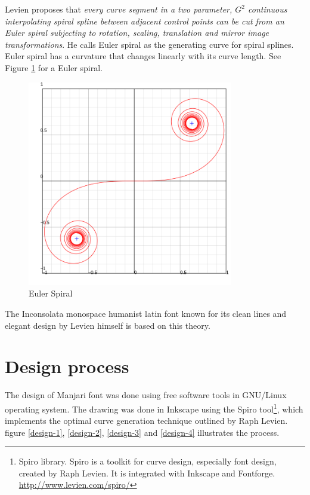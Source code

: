\documentclass[11pt,twoside,a4paper,parskip=full]{scrartcl}
\begin{document}
Levien proposes that \textit{every curve segment in a two parameter,  $G^2$ continuous interpolating spiral spline between adjacent control points can be cut from an Euler spiral subjecting to rotation, scaling, translation and mirror image transformations}. He calls Euler spiral as the generating curve for spiral splines. Euler spiral has a curvature that changes linearly with its curve length. See Figure \ref{eulerspiral} for a Euler spiral.


\begin{figure}
	\includegraphics[width=0.8\textwidth]{images/Euler_spiral.png}
	\caption{Euler Spiral}
	\label{eulerspiral}
\end{figure}


The Inconsolata monospace humanist latin font known for its clean lines and elegant design by Levien himself is based on this theory.

\section{Design process}

The design of Manjari font was done using free software tools in GNU/Linux operating system. The drawing was done in Inkscape using the Spiro tool\footnote{Spiro library. Spiro is a toolkit for curve design, especially font design, created by Raph Levien. It is integrated with Inkscape and Fontforge. \url{http://www.levien.com/spiro/}}, which implements the optimal curve generation technique outlined by Raph Levien. figure \ref{design-1}, \ref{design-2}, \ref{design-3} and \ref{design-4} illustrates the process.
\end{document}
